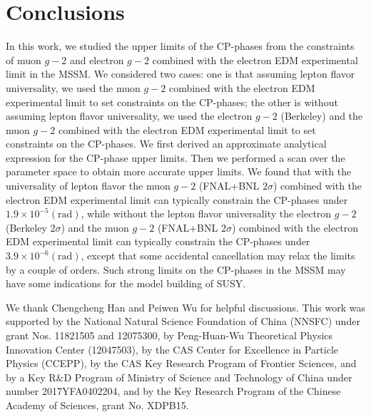 \documentclass[a4paper,11pt]{article}
\begin{document}
   \section{Conclusions}\label{sec:conclusions}
   In this work, we studied the upper limits of the CP-phases from the constraints of muon $g-2$ and electron $g-2$ combined with the electron EDM experimental limit in the MSSM. We considered two cases:
   one is that assuming lepton flavor universality, we used the muon $g-2$ combined with the electron EDM experimental limit to set constraints on the CP-phases; the other is without assuming lepton flavor universality, we used the electron $g-2$ (Berkeley) and the muon $g-2$ combined with the electron EDM experimental limit to set constraints on the CP-phases. 
   We first derived an approximate analytical expression for the CP-phase upper limits.
   Then we performed a scan over the parameter space to obtain more accurate upper limits.
   We found that with the universality of lepton flavor the muon $g-2$ (FNAL+BNL $2\sigma$) combined with  the electron EDM experimental limit can typically constrain the CP-phases 
   under $1.9\times 10^{-5} (\text{rad})$, while without the lepton flavor universality the electron $g-2$ (Berkeley $2\sigma$) and the muon $g-2$ (FNAL+BNL $2\sigma$) combined with the electron EDM experimental limit can typically constrain the CP-phases under $3.9\times 10^{-6}(\text{rad})$,
   except that some accidental cancellation may relax the limits by a couple of orders.
   Such strong limits on the CP-phases in the MSSM may have some indications for the model building of SUSY. 
   
   
\acknowledgments
We thank Chengcheng Han and Peiwen Wu for helpful discussions. This work was supported by the National
Natural Science Foundation of China (NNSFC) under grant Nos. 11821505 and 12075300,
by Peng-Huan-Wu Theoretical Physics Innovation Center (12047503), by the CAS Center
for Excellence in Particle Physics (CCEPP), by the CAS Key Research Program of Frontier
Sciences, and by a Key R\&D Program of Ministry of Science and Technology of China under
number 2017YFA0402204, and by the Key Research Program of the Chinese Academy of
Sciences, grant No. XDPB15.



\end{document}
